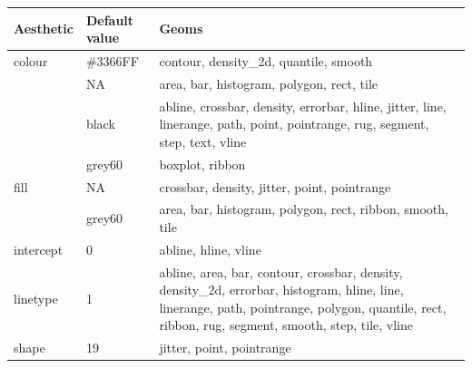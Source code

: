 \begin{table}
  \begin{center}
  \begin{tabular}{llp{4in}}
    \toprule
    Aesthetic & Default value & Geoms \\
    \midrule
    colour & \#3366FF & contour, density\_2d, quantile, smooth                                                                                                                                                                \\
     & NA      & area, bar, histogram, polygon, rect, tile                                                                                                                                                            \\
     & black   & abline, crossbar, density, errorbar, hline, jitter, line, linerange, path, point, pointrange, rug, segment, step, text, vline                                                                        \\
     & grey60  & boxplot, ribbon                                                                                                                                                                                      \\
    fill & NA        & crossbar, density, jitter, point, pointrange                                                                                                                                                         \\
     & grey60    & area, bar, histogram, polygon, rect, ribbon, smooth, tile                                                                                                                                            \\
    intercept & 0    & abline, hline, vline                                                                                                                                                                                 \\
    linetype & 1     & abline, area, bar, contour, crossbar, density, density\_2d, errorbar, histogram, hline, line, linerange, path, pointrange, polygon, quantile, rect, ribbon, rug, segment, smooth, step, tile, vline   \\
    shape & 19       & jitter, point, pointrange                                                                                                                                                                            \\

\end{tabular}
\end{center}
\end{table}
